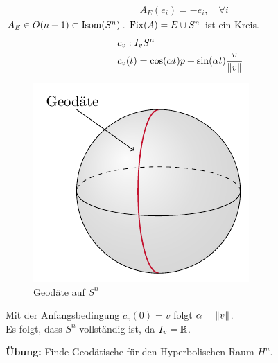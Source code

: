 \begin{bsp}
\begin{align*}
& A_E(e_i) = - e_i, \quad \forall i
\end{align*}
$A_E \in O(n+1)  \subset \operatorname{Isom} (S^n)$.
$\operatorname{Fix} (A) = E \cup S^n$ ist ein Kreis.
\begin{align}
&c_v : I_v S^n\\
&c_v(t) = \cos (\alpha t) p + \sin (\alpha t) \frac{v}{\norm{v}}
\end{align}
\begin{figure}[H]
\centering
\includegraphics[width=0.4\linewidth]{figures/tikz/geodesic_sphere.pdf}
\caption{Geodäte auf $S^n$}
\label{img:sphere_tangent_space}
\end{figure} 	
Mit der Anfangsbedingung $\dot{c}_v (0) = v$ folgt $\alpha = \norm{v}$.\\
Es folgt, dass $S^n$ vollständig ist, da $I_v = \mathbb{R}$.
\end{bsp}
\textbf{Übung:} Finde Geodätische für den Hyperbolischen Raum $H^n$.
